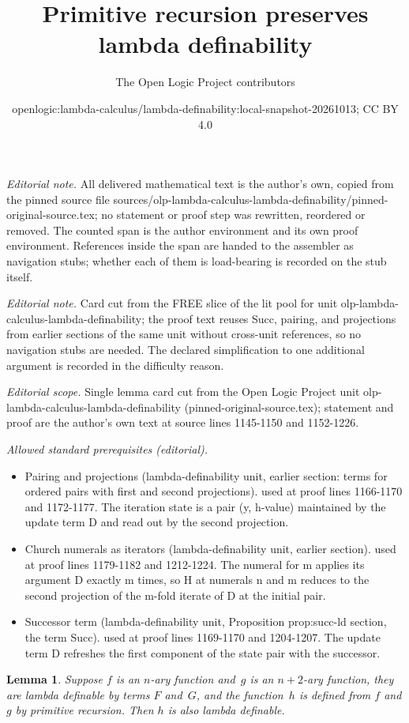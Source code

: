 \documentclass[10pt,a4paper]{article}
\title{Primitive recursion preserves lambda definability}
\author{The Open Logic Project contributors}
\date{openlogic:lambda-calculus/lambda-definability:local-snapshot-20261013; CC BY 4.0}
\newcommand*{\olup}[1]{#1}   %
\theoremstyle{plain}
\newtheorem{lem}[thm]{Lemma}
\theoremstyle{definition}
\theoremstyle{remark}
\newcommand*{\ollabel}[1]{\label{#1}}
\providecommand{\formula}{\relax}
\providecommand{\formula}[1]{#1}
\renewcommand{\olup}[1]{#1}
\begin{document}
\maketitle
\noindent\textit{Editorial note.} All delivered mathematical text is the author's own, copied from the pinned source file sources/olp-lambda-calculus-lambda-definability/pinned-original-source.tex; no statement or proof step was rewritten, reordered or removed. The counted span is the author environment and its own proof environment. References inside the span are handed to the assembler as navigation stubs; whether each of them is load-bearing is recorded on the stub itself.\par\medskip
\noindent\textit{Editorial note.} Card cut from the FREE slice of the lit pool for unit olp-lambda-calculus-lambda-definability; the proof text reuses Succ, pairing, and projections from earlier sections of the same unit without cross-unit references, so no navigation stubs are needed. The declared simplification to one additional argument is recorded in the difficulty reason.\par\medskip
\noindent\textit{Editorial scope.} Single lemma card cut from the Open Logic Project unit olp-lambda-calculus-lambda-definability (pinned-original-source.tex); statement and proof are the author's own text at source lines 1145-1150 and 1152-1226.\par\medskip
\noindent\textit{Allowed standard prerequisites (editorial).}\begin{itemize}
\item Pairing and projections (lambda-definability unit, earlier section: terms for ordered pairs with first and second projections). used at proof lines 1166-1170 and 1172-1177. The iteration state is a pair (y, h-value) maintained by the update term D and read out by the second projection.
\item Church numerals as iterators (lambda-definability unit, earlier section). used at proof lines 1179-1182 and 1212-1224. The numeral for m applies its argument D exactly m times, so H at numerals n and m reduces to the second projection of the m-fold iterate of D at the initial pair.
\item Successor term (lambda-definability unit, Proposition prop:succ-ld section, the term Succ). used at proof lines 1169-1170 and 1204-1207. The update term D refreshes the first component of the state pair with the successor.
\end{itemize}\medskip
\begin{lem}\ollabel{lem:prim}
  Suppose $f$ is an $n$-ary function and~$g$ is an $n+2$-ary function,
  they are \olup{lambda definable} by terms $F$ and~$G$, and the
  function~$h$ is defined from $f$ and $g$ by primitive
  recursion. Then $h$ is also \olup{lambda definable}.
\end{lem}
\end{document}
